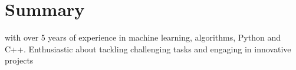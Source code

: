 \section{Summary}
\summaryPosition\space with over 5 years of experience in machine learning, algorithms, Python and C++. Enthusiastic about tackling challenging tasks and engaging in innovative projects
